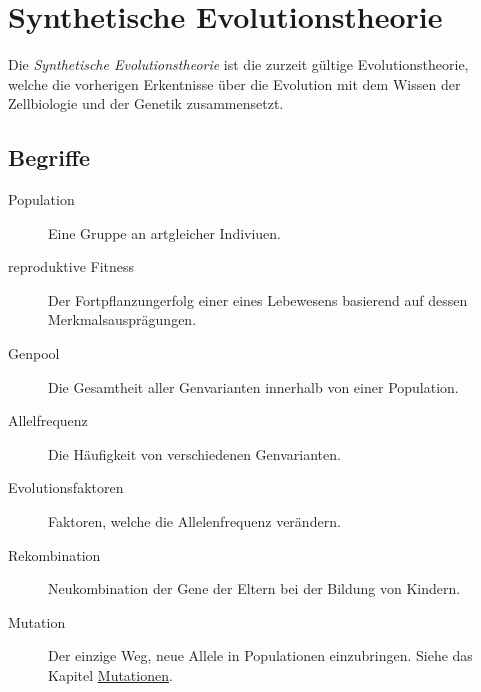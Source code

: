 \documentclass{article}
\begin{document}
\section{Synthetische Evolutionstheorie}
Die \emph{Synthetische Evolutionstheorie} ist die zurzeit gültige Evolutionstheorie, welche die vorherigen Erkentnisse über die Evolution mit dem Wissen der Zellbiologie und der Genetik zusammensetzt.
 
\subsection{Begriffe}
\begin{description} 
 \item[Population] Eine Gruppe an artgleicher Indiviuen.
 \item[reproduktive Fitness] Der Fortpflanzungerfolg einer eines Lebewesens basierend auf dessen Merkmalsausprägungen.
 \item[Genpool] Die Gesamtheit aller Genvarianten innerhalb von einer Population.
 \item[Allelfrequenz] Die Häufigkeit von verschiedenen Genvarianten.
 \item[Evolutionsfaktoren] Faktoren, welche die Allelenfrequenz verändern.
 \item[Rekombination] Neukombination der Gene der Eltern bei der Bildung von Kindern.
 \item[Mutation] Der einzige Weg, neue Allele in Populationen einzubringen. Siehe das Kapitel \hyperref[Mutationen]{Mutationen}. 
\end{description} 
\end{document}
